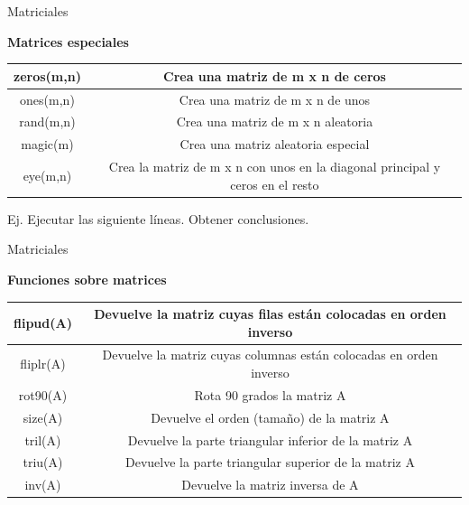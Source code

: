\documentclass{bredelebeamer}
\begin{document}
\begin{frame}{Matriciales}
\begin{center}
\textbf{Matrices especiales}
\end{center}
\begin{table}[]
\centering
\begin{tabular}{|c|c|}
\hline
zeros(m,n) & Crea una matriz de m x n de ceros                                             \\ \hline
ones(m,n)  & Crea una matriz de m x n de unos                                              \\ \hline
rand(m,n)  & Crea una matriz de m x n aleatoria                                            \\ \hline
magic(m)   & Crea una matriz aleatoria especial                                            \\ \hline
eye(m,n)   & Crea la matriz de m x n con unos en la diagonal principal y ceros en el resto \\ \hline
\end{tabular}
\end{table}
Ej. Ejecutar las siguiente líneas. Obtener conclusiones.

\end{frame}

\begin{frame}{Matriciales}
\begin{center}
\textbf{Funciones sobre matrices}
\end{center}
\begin{table}[]
\centering
\begin{tabular}{|c|c|}
\hline
flipud(A) & Devuelve la matriz cuyas filas están colocadas en orden inverso    \\ \hline
fliplr(A) & Devuelve la matriz cuyas columnas están colocadas en orden inverso \\ \hline
rot90(A)  & Rota 90 grados la matriz A                                          \\ \hline
size(A)   & Devuelve el orden (tamaño) de la matriz A                          \\ \hline
tril(A)   & Devuelve la parte triangular inferior de la matriz A                \\ \hline
triu(A)   & Devuelve la parte triangular superior de la matriz A                \\ \hline
inv(A)    & Devuelve la matriz inversa de A                                     \\ \hline
\end{tabular}
\end{table}
\end{frame}
\end{document}
